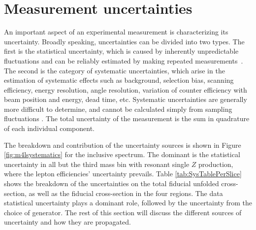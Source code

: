 \section{Measurement uncertainties}
\label{sec:uncertainties}
An important aspect of an experimental measurement is characterizing its uncertainty. Broadly speaking, uncertainties can be divided into two types. The first is the statistical uncertainty, which is caused by inherently unpredictable fluctuations and can be reliably estimated by making repeated measurements~\cite{Kar:ab1be6}. The second is the category of systematic uncertainties, which arise in the estimation of systematic effects such as background, selection bias, scanning efficiency, energy resolution, angle resolution, variation of counter efficiency with beam position and energy, dead time, etc\cite{orear}. Systematic uncertainties are generally more difficult to determine, and cannot be calculated simply from sampling fluctuations \cite{reygers}. The total uncertainty of the measurement is the sum in quadrature of each individual component.

The breakdown and contribution of the uncertainty sources is shown in Figure \ref{fig:m4lsystematics} for the inclusive \mFourL{} spectrum. The dominant is the statistical uncertainty in all but the third mass bin with resonant single $Z$ production, where the lepton efficiencies' uncertainty prevails. Table \ref{tab:SysTablePerSlice} shows the breakdown of the uncertainties on the total fiducial unfolded cross-section, as well as the fiducial cross-section in the four \mFourL{} regions. The data statistical uncertainty plays a dominant role, followed by the uncertainty from the choice of generator. The rest of this section will discuss the different sources of uncertainty and how they are propagated.

